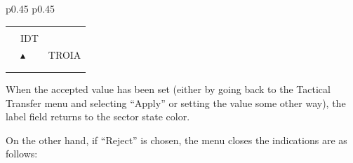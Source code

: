 \documentclass[a4paper,oneside,11pt]{memoir}
\begin{document}
\begin{longtable}{p{} p{}}
  \begin{tabular}{
    >{\columncolor{Flight Highlight}}l 
    >{\columncolor{Flight Highlight}}l
    >{\columncolor{Flight Highlight}}l }
    {\color{Coordination} H360} & {\color{Coordination} }       & {\color{Coordination} }      \\
    {\color{Coordination} ABC123} & {\color{Coordination} IDT}       & {\color{Coordination} }      \\
    {\color{Coordination} 100}    & {\color{Coordination} $\blacktriangle$} & {\color{Coordination} TROIA} \\
    {\color{Coordination} 180}    & {\color{Coordination} }          & {\color{Coordination} }  \\   
    {\color{Information} AHDG}    & {\color{Coordination} }          & {\color{Coordination} }  \\   
  \end{tabular} 
\end{longtable}

\bigskip

When the accepted value has been set (either by going back to the Tactical Transfer menu and selecting “Apply” or setting the value some other way), the label field returns to the sector state color.

\bigskip

On the other hand, if “Reject” is chosen, the menu closes the indications are as follows:

\bigskip
\end{document}
